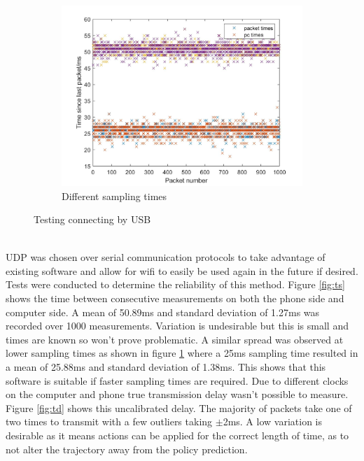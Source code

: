 \documentclass[twoside,twocolumn,12pt]{article}
\begin{document}
\begin{figure}[hb!]
\begin{subfigure}[t]{0.325\textwidth}
    \includegraphics[width=\linewidth]{both}
    \caption{Different sampling times}
  \label{fig:ts2}
  \end{subfigure}
  \caption{Testing connecting by USB}
  \label{fig:usb}
\end{figure}

\begin{align*}
[t, a_x, a_y ,a_z , \dot{\alpha}_x, \dot{\alpha}_y , \dot{\alpha}_z \#]
\end{align*}

UDP was chosen over serial communication protocols to take advantage of existing software and allow for wifi to easily be used again in the future if desired.
\newline
Tests were conducted to determine the reliability of this method. Figure \ref{fig:ts} shows the time between consecutive measurements on both the phone side and computer side. A mean of 50.89ms and standard deviation of 1.27ms was recorded over 1000 measurements. Variation is undesirable but this is small and times are known so won't prove problematic. A similar spread was observed at lower sampling times as shown in figure \ref{fig:ts2} where a 25ms sampling time resulted in a mean of 25.88ms and standard deviation of 1.38ms. This shows that this software is suitable if faster sampling times are required.
\newline
Due to different clocks on the computer and phone true transmission delay wasn't possible to measure. Figure \ref{fig:td} shows this uncalibrated delay. The majority of packets take one of two times to transmit with a few outliers taking $\pm$2ms. A low variation is desirable as it means actions can be applied for the correct length of time, as to not alter the trajectory away from the policy prediction.
\end{document}
